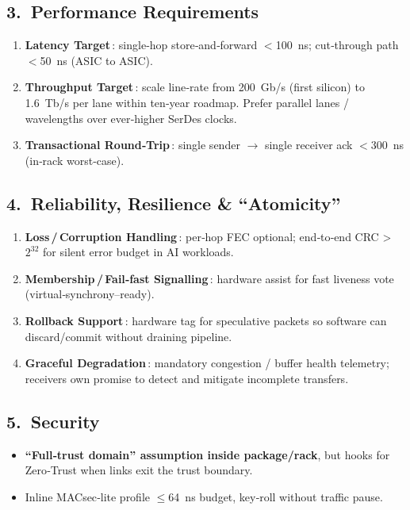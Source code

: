 \documentclass[HFT-main.tex]{subfiles}
\begin{document}
\subsection*{3.\ Performance Requirements}
\begin{enumerate}%
  \item \textbf{Latency Target}\,: single‑hop store‑and‑forward $<$100 ns; cut‑through path $<$50 ns (ASIC to ASIC).  
  \item \textbf{Throughput Target}\,: scale line‑rate from 200 Gb/s (first silicon) to 1.6 Tb/s per lane within ten‑year roadmap.  
        Prefer parallel lanes / wavelengths over ever‑higher SerDes clocks.  
  \item \textbf{Transactional Round‑Trip}\,: single sender $\rightarrow$ single receiver ack $<$300 ns (in‑rack worst‑case).
\end{enumerate}

\subsection*{4.\ Reliability, Resilience \& “Atomicity”}
\begin{enumerate}%
  \item \textbf{Loss\,/\,Corruption Handling}\,: per‑hop FEC optional; end‑to‑end CRC \textgreater\,$2^{32}$ for silent error budget in AI workloads.  
  \item \textbf{Membership\,/\,Fail‑fast Signalling}\,: hardware assist for fast liveness vote (virtual‑synchrony–ready).  
  \item \textbf{Rollback Support}\,: hardware tag for speculative packets so software can discard/commit without draining pipeline.  
  \item \textbf{Graceful Degradation}\,: mandatory congestion / buffer health telemetry; receivers own promise to detect and mitigate incomplete transfers.
\end{enumerate}

\subsection*{5.\ Security}
\begin{itemize}
  \item \textbf{“Full‑trust domain” assumption inside package/rack}, but hooks for Zero‑Trust when links exit the trust boundary.  
  \item Inline MACsec‑lite profile $\le$64 ns budget, key‑roll without traffic pause.
\end{itemize}
\end{document}
